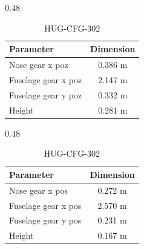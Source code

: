 \begin{table}[H]
    \centering
    \small
    \caption{Landing gear dimensions and observations}
    \label{tab:landing_gear_tradeoff}

    \begin{subtable}[t]{0.48\textwidth}
        \centering
        \caption{HUG-CFG-301}
        \begin{tabularx}{\linewidth}{|@{}X c@{}|}
            \hline
            \textbf{Parameter} & \textbf{Dimension}  \\
            \hline \hline
            Nose gear x poz & 0.386 m \\
            Fuselage gear x poz & 2.147 m \\
            Fuselage gear y poz & 0.332 m\\
            Height & 0.281 m\\
            \hline
        \end{tabularx}
    \end{subtable}
    \hfill
    \begin{subtable}[t]{0.48\textwidth}
        \centering
        \caption{HUG-CFG-302}
        \begin{tabularx}{\linewidth}{|@{}X c@{}|}
            \hline
            \textbf{Parameter} & \textbf{Dimension}  \\
            \hline \hline
            Nose gear x pos & 0.272 m \\
            Fuselage gear x pos & 2.570 m \\
            Fuselage gear y pos & 0.231 m\\
            Height & 0.167 m\\
            \hline
        \end{tabularx}
    \end{subtable}

    \vspace{0.5cm}


\end{table}
